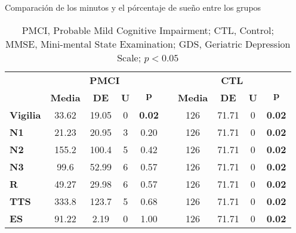 \documentclass[10pt,a4paper]{article}
\begin{document}
\begin{table}
\centering
\caption{Comparación de los minutos y el pórcentaje de sueño entre los grupos}
\begin{tabularx}{\columnwidth}{Xcccclcccc}
\toprule 
     & \multicolumn{4}{c}{\bf PMCI} & \phantom{.} & \multicolumn{4}{c}{\bf CTL} \\
     \cmidrule{2-5} \cmidrule{7-10} 
     & \bf Media & \bf DE & \bf U & $\mathbf{p}$ & & \bf Media & \bf DE & \bf U & $\mathbf{p}$ \\
\midrule
\bf Vigilia & 33.62 & 19.05 & 0 & \bf 0.02 && 126  & 71.71 & 0 & \bf 0.02 \\
\bf N1      & 21.23 & 20.95 & 3 &     0.20 && 126  & 71.71 & 0 & \bf 0.02 \\
\bf N2      & 155.2 & 100.4 & 5 &     0.42 && 126  & 71.71 & 0 & \bf 0.02 \\
\bf N3      & 99.6  & 52.99 & 6 &     0.57 && 126  & 71.71 & 0 & \bf 0.02 \\
\bf R       & 49.27 & 29.98 & 6 &     0.57 && 126  & 71.71 & 0 & \bf 0.02 \\
\bf TTS     & 333.8 & 123.7 & 5 &     0.68 && 126  & 71.71 & 0 & \bf 0.02 \\
\bf ES      & 91.22 & 2.19  & 0 &     1.00 && 126  & 71.71 & 0 & \bf 0.02 \\
\bottomrule
\end{tabularx}
\caption*{PMCI, Probable Mild Cognitive Impairment; CTL, Control; MMSE, Mini-mental State Examination;
GDS, Geriatric Depression Scale; $p<0.05$}
\end{table}
\end{document}
